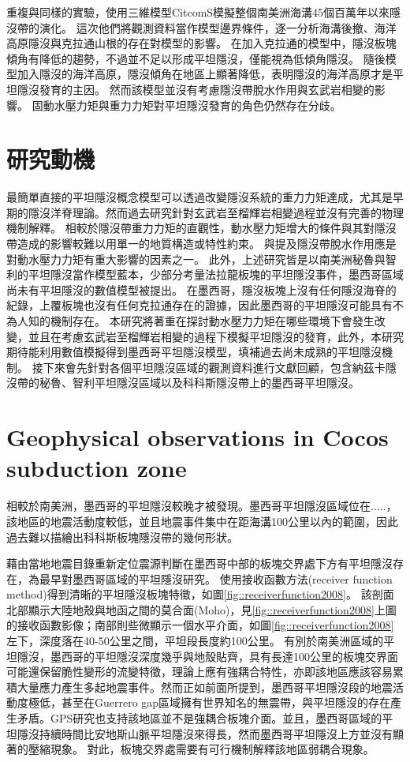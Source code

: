 \citealp{Hu2016}重複與\citealp{Manea2012Chile}同樣的實驗，使用三維模型CitcomS模擬整個南美洲海溝45個百萬年以來隱沒帶的演化。
這次他們將觀測資料當作模型邊界條件，逐一分析海溝後撤、海洋高原隱沒與克拉通山根的存在對模型的影響。
在加入克拉通的模型中，隱沒板塊傾角有降低的趨勢，不過並不足以形成平坦隱沒，僅能視為低傾角隱沒。
隨後模型加入隱沒的海洋高原，隱沒傾角在地區上顯著降低，表明隱沒的海洋高原才是平坦隱沒發育的主因。
然而該模型並沒有考慮隱沒帶脫水作用與玄武岩相變的影響。
固動水壓力矩與重力力矩對平坦隱沒發育的角色仍然存在分歧。

\section{研究動機}
最簡單直接的平坦隱沒概念模型可以透過改變隱沒系統的重力力矩達成，尤其是早期的隱沒洋脊理論。然而過去研究針對玄武岩至榴輝岩相變過程並沒有完善的物理機制解釋。
相較於隱沒帶重力力矩的直觀性，動水壓力矩增大的條件與其對隱沒帶造成的影響較難以用單一的地質構造或特性約束。
\citealp{Manea2017}與\citealp{Yan2020}提及隱沒帶脫水作用應是對動水壓力力矩有重大影響的因素之一。
此外，上述研究皆是以南美洲秘魯與智利的平坦隱沒當作模型藍本，少部分考量法拉龍板塊的平坦隱沒事件，墨西哥區域尚未有平坦隱沒的數值模型被提出。
在墨西哥，隱沒板塊上沒有任何隱沒海脊的紀錄，上覆板塊也沒有任何克拉通存在的證據，因此墨西哥的平坦隱沒可能具有不為人知的機制存在。
本研究將著重在探討動水壓力力矩在哪些環境下會發生改變，並且在考慮玄武岩至榴輝岩相變的過程下模擬平坦隱沒的發育，此外，本研究期待能利用數值模擬得到墨西哥平坦隱沒模型，填補過去尚未成熟的平坦隱沒機制。
接下來會先針對各個平坦隱沒區域的觀測資料進行文獻回顧，包含納茲卡隱沒帶的秘魯、智利平坦隱沒區域以及科科斯隱沒帶上的墨西哥平坦隱沒。

\section{Geophysical observations in Cocos subduction zone}
相較於南美洲，墨西哥的平坦隱沒較晚才被發現。墨西哥平坦隱沒區域位在.....，該地區的地震活動度較低，並且地震事件集中在距海溝100公里以內的範圍，因此過去難以描繪出科科斯板塊隱沒帶的幾何形狀。

\citealp{pardo1995}藉由當地地震目錄重新定位震源判斷在墨西哥中部的板塊交界處下方有平坦隱沒存在，為最早對墨西哥區域的平坦隱沒研究。
\citealp{PerezCampos2008}使用接收函數方法(receiver function method)得到清晰的平坦隱沒板塊特徵，如圖\ref{fig::receiverfunction2008}。
該剖面北部顯示大陸地殼與地函之間的莫合面(Moho)，見\ref{fig::receiverfunction2008}上圖的接收函數影像；南部則些微顯示一個水平介面，如圖\ref{fig::receiverfunction2008}左下，深度落在40-50公里之間，平坦段長度約100公里。
有別於南美洲區域的平坦隱沒，墨西哥的平坦隱沒深度幾乎與地殼貼齊，具有長達100公里的板塊交界面可能還保留脆性變形的流變特徵，理論上應有強耦合特性，亦即該地區應該容易累積大量應力產生多起地震事件。然而正如前面所提到，墨西哥平坦隱沒段的地震活動度極低，甚至在Guerrero gap區域擁有世界知名的無震帶，與平坦隱沒的存在產生矛盾。GPS研究也支持該地區並不是強耦合板塊介面。並且，墨西哥區域的平坦隱沒持續時間比安地斯山脈平坦隱沒來得長，然而墨西哥平坦隱沒上方並沒有顯著的壓縮現象。
對此，板塊交界處需要有可行機制解釋該地區弱耦合現象。

